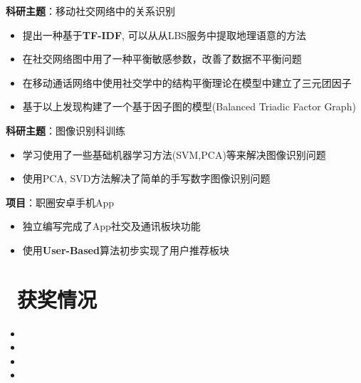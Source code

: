\documentclass{resume}
\begin{document}
\textbf{科研主题}：移动社交网络中的关系识别
\begin{itemize}
\item 提出一种基于\textbf{TF-IDF}, 可以从从LBS服务中提取地理语意的方法
\item 在社交网络图中用了一种平衡敏感参数，改善了数据不平衡问题
\item 在移动通话网络中使用社交学中的结构平衡理论在模型中建立了三元团因子
\item 基于以上发现构建了一个基于因子图的模型(Balanced Triadic Factor Graph)
\end{itemize}

\textbf{科研主题}：图像识别科训练
\begin{itemize}
\item 学习使用了一些基础机器学习方法(SVM,PCA)等来解决图像识别问题
\item 使用PCA, SVD方法解决了简单的手写数字图像识别问题
\end{itemize}

\textbf{项目}：职圈安卓手机App
\begin{itemize}
\item 独立编写完成了App社交及通讯板块功能
\item 使用\textbf{User-Based}算法初步实现了用户推荐板块
\end{itemize}



\section{\faHeartO\ 获奖情况}
\begin{itemize}
\item {}
\item {}
\item {}
\item {}
\end{itemize}

%
%
\end{document}

